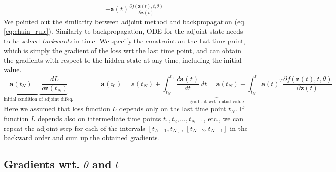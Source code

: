 \documentclass{article}
\newcommand{\va}{\mathbf{a}}
\newcommand{\vz}{\mathbf{z}}
\newcommand{\sol}{\vz}  %
\newcommand{\adj}{\va}
\begin{document}
\begin{appendices}
\begin{align}
&= - \adj(t)\frac{\partial f(\sol(t), t, \theta)}{\partial \sol(t)}\label{eq:adjoint_z}
\end{align}
We pointed out the similarity between adjoint method and backpropagation (eq. \ref{eq:chain_rule}). Similarly to backpropagation, ODE for the adjoint state needs to be solved \textit{backwards} in time. We specify the constraint on the last time point, which is simply the gradient of the loss wrt the last time point, and can obtain the gradients with respect to the hidden state at any time, including the initial value.
\begin{equation}\label{eq:gradient_iv}
\underbrace{\adj(t_N) = \frac{dL}{d \sol(t_N)}}_{\text{initial condition of adjoint diffeq.}} \quad\quad\quad\quad \underbrace{\adj(t_0) = \adj(t_N) + \int_{t_N}^{t_0} \frac{d\adj(t)}{dt} \;dt = \adj(t_N) - \int_{t_N}^{t_0} \adj(t)^T \frac{\partial f(\sol(t), t, \theta)}{\partial \sol(t)}}_{\text{gradient wrt. initial value}}
\end{equation}
Here we assumed that loss function $L$ depends only on the last time point $t_N$. If function $L$ depends also on intermediate time points $t_1, t_2, \dots, t_{N-1}$, etc., we can repeat the adjoint step for each of the intervals $[t_{N-1}, t_N]$, $[t_{N-2}, t_{N-1}]$ in the backward order and sum up the obtained gradients.

\subsection{Gradients wrt. $\theta$ and $t$}


\end{appendices}
\end{document}
